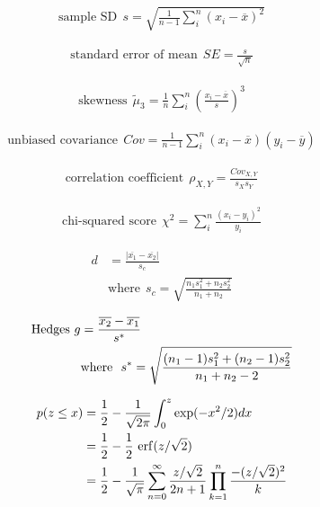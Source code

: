 \begin{align*} 
    \text{sample SD}~~s = \sqrt{\frac{1}{n-1}\sum_i^{n}(x_i-\overline{x})^2}
\end{align*}

\begin{align*} 
    \text{standard error of mean}~~SE = \frac{s}{\sqrt{n}}
\end{align*}

\begin{align*} 
    \text{skewness}~~\tilde{\mu}_3 = \frac{1}{n}\sum_i^{n}\left(\frac{x_i-\overline{x}}{s}\right)^3
\end{align*}

\begin{align*} 
    \text{unbiased covariance}~~Cov = \frac{1}{n-1}\sum_i^{n}(x_i-\overline{x})(y_i-\overline{y})
\end{align*}

\begin{align*} 
    \text{correlation coefficient}~~\rho_{X,Y} = \frac{Cov_{X,Y}}{s_{X}s_{Y}}
\end{align*}

\begin{align*} 
    \text{chi-squared score}~~\chi^2 = \sum_i^{n}\frac{(x_i-y_i)^2}{y_i}
\end{align*}

\begin{align*} 
    d &= \frac{|\overline{x_1}-\overline{x_2}|}{s_c} \\
    &\text{where}~~s_c = \sqrt{\frac{n_1s_1^2+n_2s_2^2}{n_1+n_2}}
\end{align*}

\begin{align*}
    {\rm Hedges}~g &= \frac{\overline{x_2}-\overline{x_1}}{s^*} \\
    &\text{where}~~s^* = \sqrt{\frac{(n_1-1)s_1^2+(n_2-1)s_2^2}{n_1+n_2-2}}
\end{align*}


\begin{align*} 
    p(z \leq x) &= \frac{1}{2} - \frac{1}{\sqrt{2\pi}}\int_{0}^{z}\exp(-x^2/2)dx \\
    &= \frac{1}{2}-\frac{1}{2}~{\rm erf}(z/\sqrt{2}) \\
    &= \frac{1}{2}-\frac{1}{\sqrt{\pi}}\sum_{n=0}^{\infty}\frac{z/\sqrt{2}}{2n+1}\prod_{k=1}^{n}\frac{-(z/\sqrt{2})^2}{k}
\end{align*}

